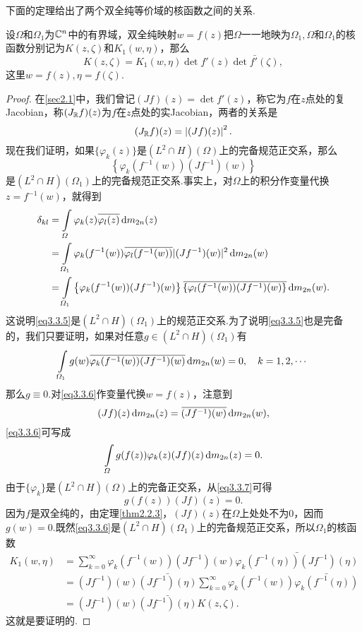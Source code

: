 下面的定理给出了两个双全纯等价域的核函数之间的关系.
\begin{theorem}\label{thm3.3.6}
	设$\Omega$和$\Omega_1$为$\mathbb C^n$中的有界域，双全纯映射$w=f(z)$把$\Omega$一一地映为$\Omega_1,\Omega$和$\Omega_1$的核函数分别记为$K(z,\zeta)$和$K_1(w,\eta)$，那么
	\[K(z,\zeta)=K_1(w,\eta)\det f'(z)\bar{\det f'(\zeta)},\]
	这里$w=f(z),\eta=f(\zeta)$.
\end{theorem}
\begin{proof}
	在\ref{sec2.1}中，我们曾记$(Jf)(z)=\det f'(z)$，称它为$f$在$z$点处的复Jacobian，称$(J_\mathbb R f)(z)$为$f$在$z$点处的实Jacobian，两者的关系是
	\[(J_\mathbb R f)(z)=\left|(Jf)(z)\right|^2.\]
	现在我们证明，如果$\{\varphi_k(z)\}$是$(L^2\cap H)(\Omega)$上的完备规范正交系，那么
	\begin{equation}\label{eq3.3.5}
		\left\{\varphi_k(f^{-1}(w))(Jf^{-1})(w)\right\}
	\end{equation}
是$(L^2\cap H)(\Omega_1)$上的完备规范正交系.事实上，对$\Omega$上的积分作变量代换$z=f^{-1}(w)$，就得到
\begin{align*}
	\delta_{kl}
	&=\int\limits_\varOmega \varphi_k(z){}\mkern1mu\overline{\mkern-1mu\varphi_l(z)}\mathop{}\!\mathrm{d} m_{2n}(z)\\
	&=\int\limits_{\varOmega_1} \varphi_k(f^{-1}(w)){}\mkern1mu\overline{\mkern-1mu\varphi_l(f^{-1}(w))}|(Jf^{-1})(w)|^2\mathop{}\!\mathrm{d} m_{2n}(w)\\
	&=\int\limits_{\varOmega_1}\left\{\varphi_k(f^{-1}(w))(Jf^{-1})(w)\right\} {}\mkern1mu\overline{\mkern-1mu\left\{\varphi_l(f^{-1}(w))(Jf^{-1})(w)\right\}}\mathop{}\!\mathrm{d} m_{2n}(w).
\end{align*}
这说明\eqref{eq3.3.5}是$(L^2\cap H)(\Omega_1)$上的规范正交系.为了说明\eqref{eq3.3.5}也是完备的，我们只要证明，如果对任意$g\in(L^2\cap H)(\Omega_1)$有
\begin{equation}\label{eq3.3.6}
	\int\limits_{\varOmega_1}g(w) {}\mkern1mu\overline{\mkern-1mu\varphi_k(f^{-1}(w))(Jf^{-1})(w)}\mathop{}\!\mathrm{d} m_{2n}(w)=0,\quad k=1,2,\cdots
\end{equation}
那么$g\equiv0$.对\eqref{eq3.3.6}作变量代换$w=f(z)$，注意到
\[(Jf)(z)\mathop{}\!\mathrm{d} m_{2n}(z)={}\mkern1mu\overline{\mkern-1mu(Jf^{-1})(w)}\mathop{}\!\mathrm{d} m_{2n}(w),\]
\eqref{eq3.3.6}可写成
\begin{equation}\label{eq3.3.7}
	\int\limits_\varOmega g(f(z))\varphi_k(z)(Jf)(z)\mathop{}\!\mathrm{d} m_{2n}(z)=0.
\end{equation}
由于$\{\varphi_k\}$是$(L^2\cap H)(\Omega)$上的完备正交系，从\eqref{eq3.3.7}可得
\[g(f(z))(Jf)(z)=0.\]
因为$f$是双全纯的，由定理\ref{thm2.2.3}，$(Jf)(z)$在$\Omega$上处处不为$0$，因而$g(w)=0$.既然\eqref{eq3.3.6}是$(L^2\cap H)(\Omega_1)$上的完备规范正交系，所以$\Omega_1$的核函数
\begin{align*}
	K_1(w,\eta)
	&=\sum_{k=0}^{\infty}\varphi_k(f^{-1}(w))(Jf^{-1})(w)\bar{\varphi_k(f^{-1}(\eta))(Jf^{-1})(\eta)}\\
	&=(Jf^{-1})(w)\bar{(Jf^{-1})(\eta)}\sum_{k=0}^{\infty}\varphi_k(f^{-1}(w))\bar{\varphi_k(f^{-1}(\eta))}\\
	&=(Jf^{-1})(w)\bar{(Jf^{-1})(\eta)}K(z,\zeta).
\end{align*}
这就是要证明的.
\end{proof}
